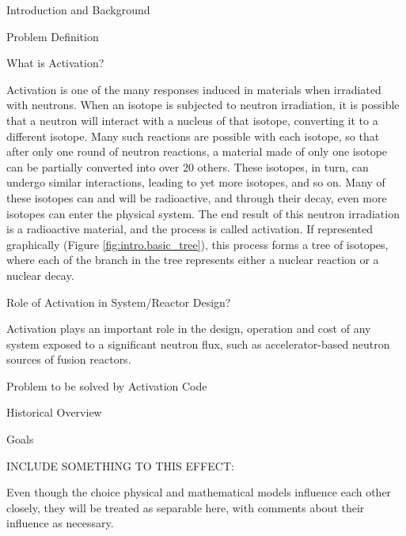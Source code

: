 \begin{chapter}{Introduction and Background}

\begin{section}{Problem Definition\label{sec:intro.prob_def}}

  \begin{subsection}{What is Activation?\label{sec:intro.prob_def.act}}
    
    Activation is one of the many responses induced in materials when
    irradiated with neutrons.  When an isotope is subjected to neutron
    irradiation, it is possible that a neutron will interact with a
    nucleus of that isotope, converting it to a different isotope.
    Many such reactions are possible with each isotope, so that after
    only one round of neutron reactions, a material made of only one
    isotope can be partially converted into over 20 others.  These
    isotopes, in turn, can undergo similar interactions, leading to
    yet more isotopes, and so on.  Many of these isotopes can and will
    be radioactive, and through their decay, even more isotopes can
    enter the physical system.  The end result of this neutron
    irradiation is a radioactive material, and the process is called
    activation.  If represented graphically (Figure
    \ref{fig:intro.basic_tree}), this process forms a tree of
    isotopes, where each of the branch in the tree represents either a
    nuclear reaction or a nuclear decay.
    
  \end{subsection}

  \begin{subsection}{Role of Activation in System/Reactor Design?}
    
    Activation plays an important role in the design, operation and
    cost of any system exposed to a significant neutron flux, such as
    accelerator-based neutron sources of fusion reactors.  
  
  \end{subsection}
  
  \begin{subsection}{Problem to be solved by Activation Code}
    
  \end{subsection}
\end{section}

\begin{section}{Historical Overview}
  
\end{section}

\begin{section}{Goals}
  
\end{section}


INCLUDE SOMETHING TO THIS EFFECT:

Even though the choice physical and mathematical models influence each
other closely, they will be treated as separable here, with comments
about their influence as necessary.

\end{chapter}